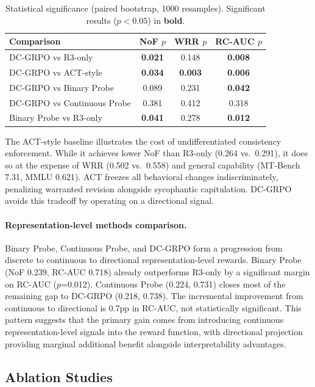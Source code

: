 \documentclass[11pt,a4paper]{article}
\begin{document}
\begin{table}[t]
\centering
\caption{Statistical significance (paired bootstrap, 1000 resamples). Significant results ($p < 0.05$) in \textbf{bold}.}
\label{tab:significance}
\small
\begin{tabular}{lccc}
\toprule
Comparison & NoF $p$ & WRR $p$ & RC-AUC $p$ \\
\midrule
DC-GRPO vs R3-only        & \textbf{0.021} & 0.148 & \textbf{0.008} \\
DC-GRPO vs ACT-style      & \textbf{0.034} & \textbf{0.003} & \textbf{0.006} \\
DC-GRPO vs Binary Probe   & 0.089 & 0.231 & \textbf{0.042} \\
DC-GRPO vs Continuous Probe & 0.381 & 0.412 & 0.318 \\
Binary Probe vs R3-only   & \textbf{0.041} & 0.278 & \textbf{0.012} \\
\bottomrule
\end{tabular}
\end{table}

The ACT-style baseline illustrates the cost of undifferentiated consistency enforcement. While it achieves lower NoF than R3-only (0.264 vs.\ 0.291), it does so at the expense of WRR (0.502 vs.\ 0.558) and general capability (MT-Bench 7.31, MMLU 0.621). ACT freezes all behavioral changes indiscriminately, penalizing warranted revision alongside sycophantic capitulation. DC-GRPO avoids this tradeoff by operating on a directional signal.

\paragraph{Representation-level methods comparison.} Binary Probe, Continuous Probe, and DC-GRPO form a progression from discrete to continuous to directional representation-level rewards. Binary Probe (NoF 0.239, RC-AUC 0.718) already outperforms R3-only by a significant margin on RC-AUC ($p$=0.012). Continuous Probe (0.224, 0.731) closes most of the remaining gap to DC-GRPO (0.218, 0.738). The incremental improvement from continuous to directional is 0.7pp in RC-AUC, not statistically significant. This pattern suggests that the primary gain comes from introducing continuous representation-level signals into the reward function, with directional projection providing marginal additional benefit alongside interpretability advantages.

\subsection{Ablation Studies}
\label{sec:ablations}
\end{document}

